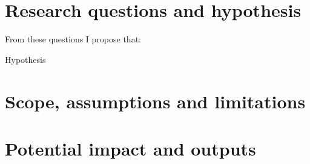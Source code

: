 \section{Research questions and hypothesis}
\label{sec:hyphothesis}


From these questions I propose that:
\begin{guess*}
	\begin{minipage}[t]{5 in}
		Hypothesis
	\end{minipage}
\end{guess*}


\section{Scope, assumptions and limitations}
\label{sec:scope}


\section{Potential impact and outputs}
\label{sec:outputs}

